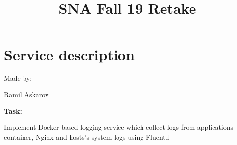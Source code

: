 \documentclass[12pt]{article}
\title{SNA Fall 19 Retake}
\date{}
\renewcommand{\_}{\kern-1.5pt\textunderscore\kern-1.5pt}
\begin{document}
\maketitle
\par

\chapter{Service description}\par

\begin{FlushRight}
\tab \tab \tab \tab \tab \tab Made by:
\end{FlushRight}\par

\begin{FlushRight}
Ramil Askarov
\end{FlushRight}\par


\vspace{\baselineskip}

\vspace{\baselineskip}
\begin{FlushLeft}
\textbf{Task:}
\end{FlushLeft}\par

\begin{adjustwidth}{0.5in}{0.0in}
\begin{FlushLeft}
Implement Docker-based logging service which collect logs from applications container, Nginx and hosts’s system logs using Fluentd
\end{FlushLeft}\par

\end{adjustwidth}
\end{document}
